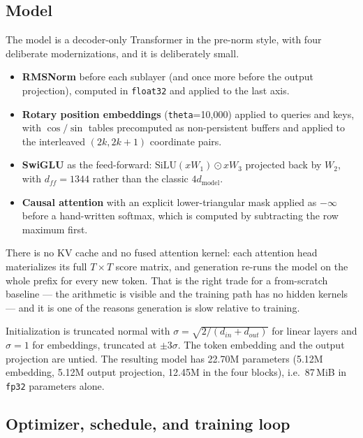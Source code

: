 \documentclass{article}
\begin{document}
\subsection{Model}

The model is a decoder-only Transformer \citep{transformer} in the pre-norm style, with four deliberate modernizations, and it is deliberately small.

\begin{itemize}
  \item \textbf{RMSNorm} \citep{rmsnorm} before each sublayer (and once more before the output projection), computed in \texttt{float32} and applied to the last axis.
  \item \textbf{Rotary position embeddings} \citep{rope} (\texttt{theta}{=}10{,}000) applied to queries and keys, with $\cos/\sin$ tables precomputed as non-persistent buffers and applied to the interleaved $(2k, 2k{+}1)$ coordinate pairs.
  \item \textbf{SwiGLU} \citep{swiglu} as the feed-forward: $\mathrm{SiLU}(xW_1) \odot xW_3$ projected back by $W_2$, with $d_{ff} = 1344$ rather than the classic $4d_{\text{model}}$.
  \item \textbf{Causal attention} with an explicit lower-triangular mask applied as $-\infty$ before a hand-written softmax, which is computed by subtracting the row maximum first.
\end{itemize}

There is no KV cache and no fused attention kernel: each attention head materializes its full $T \times T$ score matrix, and generation re-runs the model on the whole prefix for every new token. That is the right trade for a from-scratch baseline --- the arithmetic is visible and the training path has no hidden kernels --- and it is one of the reasons generation is slow relative to training.

Initialization is truncated normal with $\sigma = \sqrt{2/(d_{in}+d_{out})}$ for linear layers and $\sigma=1$ for embeddings, truncated at $\pm 3\sigma$. The token embedding and the output projection are untied. The resulting model has 22.70M parameters (5.12M embedding, 5.12M output projection, 12.45M in the four blocks), i.e.\ 87\,MiB in \texttt{fp32} parameters alone.

\subsection{Optimizer, schedule, and training loop}
\end{document}
